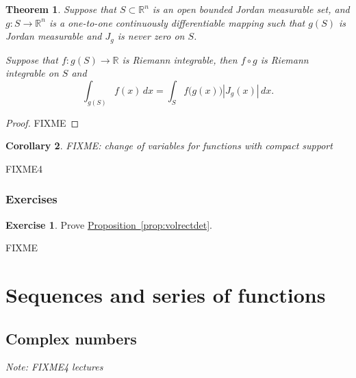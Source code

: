 \documentclass[12pt]{book}
\newcommand{\abs}[1]{\left\lvert {#1} \right\rvert}
\newcommand{\R}{{\mathbb{R}}}
\newcommand{\sectionnotes}[1]{\noindent \emph{Note: #1} \medskip \par}
\theoremstyle{plain}
\newtheorem{thm}{Theorem}[section]
\newtheorem{cor}[thm]{Corollary}
\theoremstyle{remark}
\theoremstyle{definition}
\theoremstyle{exercise}
\newtheorem{exercise}{Exercise}[section]
\theoremstyle{example}
\newcommand{\propref}[1]{\hyperref[#1]{Proposition~\ref*{#1}}}
\begin{document}
\begin{thm}
Suppose that $S \subset \R^n$ is an open bounded Jordan measurable set, and
$g \colon S \to \R^n$ is a one-to-one
continuously differentiable mapping such that
$g(S)$ is Jordan measurable and $J_g$ is never zero on $S$.

Suppose that $f \colon g(S) \to \R$ is Riemann
integrable, then $f \circ g$ is Riemann integrable on $S$ and
\begin{equation*}
\int_{g(S)} f(x) \, dx = 
\int_S f\bigl(g(x)\bigr) \abs{J_g(x)} \, dx .
\end{equation*}
\end{thm}

\begin{proof}
FIXME
\end{proof}

\begin{cor}
FIXME: change of variables for functions with compact support
\end{cor}

FIXME4

\subsection{Exercises}

\begin{exercise}
Prove \propref{prop:volrectdet}.
\end{exercise}

FIXME



\chapter{Sequences and series of functions} \label{seqser:chapter}


\section{Complex numbers}
\label{sec:complexnums}

\sectionnotes{FIXME4 lectures}
\end{document}
